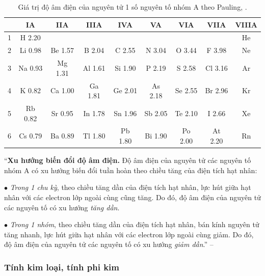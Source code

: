 \documentclass{article}
\numberwithin{equation}{section}
\begin{document}
\begin{table}[h]
	\centering
	\begin{tabular}{|c|c|c|c|c|c|c|c|c|}
		\hline
		\diagbox{\textbf{Chu kỳ}}{\textbf{Nhóm}}& IA & IIA & IIIA & IVA & VA & VIA & VIIA & VIIIA \\
		\hline
		1 & H 2.20 &  &  &  &  &  &  & He \\
		\hline
		2 & Li 0.98 & Be 1.57 & B 2.04 & C 2.55 & N 3.04 & O 3.44 & F 3.98 & Ne \\
		\hline
		3 & Na 0.93 & Mg 1.31 & Al 1.61 & Si 1.90 & P 2.19 & S 2.58 & Cl 3.16 & Ar \\
		\hline
		4 & K 0.82 & Ca 1.00 & Ga 1.81 & Ge 2.01 & As 2.18 & Se 2.55 & Br 2.96 & Kr \\
		\hline
		5 & Rb 0.82 & Sr 0.95 & In 1.78 & Sn 1.96 & Sb 2.05 & Te 2.10 & I 2.66 & Xe \\
		\hline
		6 & Cs 0.79 & Ba 0.89 & Tl 1.80 & Pb 1.80 & Bi 1.90 & Po 2.00 & At 2.20 & Rn \\
		\hline
	\end{tabular}
	\caption{Giá trị độ âm điện của nguyên tử 1 số nguyên tố nhóm A theo Pauling, \cite[Bảng 6.1, p. 44]{SGK_Hoa_Hoc_10_Chan_Troi_Sang_Tao}.}
	\label{tab:gia tri do am dien cua nguyen tu 1 so nguyen to nhom A theo Pauling}
\end{table}
``\textbf{Xu hướng biến đổi độ âm điện.} Độ âm điện của nguyên tử các nguyên tố nhóm A có xu hướng biến đổi tuần hoàn theo chiều tăng của điện tích hạt nhân:
\begin{enumerate*}
	\item[$\bullet$] \textit{Trong 1 chu kỳ}, theo chiều tăng dần của điện tích hạt nhân, lực hút giữa hạt nhân với các electron lớp ngoài cùng cũng tăng. Do đó, độ âm điện của nguyên tử các nguyên tố có xu hướng \textit{tăng dần}.
	\item[$\bullet$] \textit{Trong 1 nhóm}, theo chiều tăng dần của điện tích hạt nhân, bán kính nguyên tử tăng nhanh, lực hút giữa hạt nhân với các electron lớp ngoài cùng giảm. Do đó, độ âm điện của nguyên tử các nguyên tố có xu hướng \textit{giảm dần}.'' -- \cite[p. 45]{SGK_Hoa_Hoc_10_Chan_Troi_Sang_Tao}
\end{enumerate*}

\subsubsection{Tính kim loại, tính phi kim}
\end{document}
